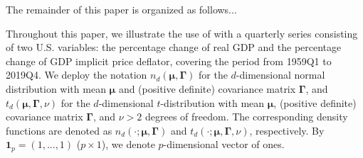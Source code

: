 \documentclass[nojss]{jss} %
\begin{document}
The remainder of this paper is organized as follows... %

Throughout this paper, we illustrate the use of  with a quarterly series consisting of two U.S. variables: the percentage change of real GDP and the percentage change of GDP implicit price deflator, covering the period from 1959Q1 to 2019Q4. We deploy the notation $n_d(\boldsymbol{\mu},\boldsymbol{\Gamma})$ for the $d$-dimensional normal distribution with mean $\boldsymbol{\mu}$ and (positive definite) covariance matrix $\boldsymbol{\Gamma}$, and $t_d(\boldsymbol{\mu},\boldsymbol{\Gamma},\nu)$ for the $d$-dimensional $t$-distribution with mean $\boldsymbol{\mu}$, (positive definite) covariance matrix $\boldsymbol{\Gamma}$, and $\nu>2$ degrees of freedom. The corresponding density functions are denoted as $n_d(\cdot;\boldsymbol{\mu},\boldsymbol{\Gamma})$ and $t_d(\cdot;\boldsymbol{\mu},\boldsymbol{\Gamma},\nu)$, respectively. By $\boldsymbol{1}_p=(1,...,1)$ ($p \times 1$), we denote $p$-dimensional vector of ones.
\end{document}
